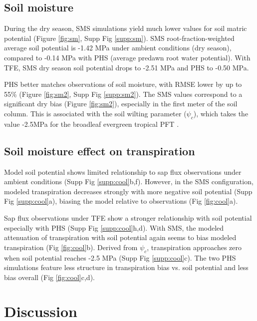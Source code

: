 \documentclass[draft,linenumbers]{agujournal}
\begin{document}
\subsection{Soil moisture}
    During the dry season, SMS simulations yield much lower values for soil matric potential (Figure \ref{fig:sm}, Supp Fig \ref{supp:sm}). 
    SMS root-fraction-weighted average soil potential is -1.42 MPa under ambient conditions (dry season), compared to -0.14 MPa with PHS (average predawn root water potential).
    With TFE, SMS dry season soil potential drops to -2.51 MPa and PHS to -0.50 MPa.

    PHS better matches observations of soil moisture, with RMSE lower by up to 55\% (Figure \ref{fig:sm2}, Supp Fig \ref{supp:sm2}).
    The SMS values correspond to a significant dry bias (Figure \ref{fig:sm2}), especially in the first meter of the soil column.
    This is associated with the soil wilting parameter ($\psi_c$), which takes the value -2.5MPa for the broadleaf evergreen tropical PFT \citep{oleson2013}.
 
\subsection{Soil moisture effect on transpiration}    
    Model soil potential shows limited relationship to sap flux observations under ambient conditions (Supp Fig \ref{supp:cool}b,f).
    However, in the SMS configuration, modeled transpiration decreases strongly with more negative soil potential (Supp Fig \ref{supp:cool}a),
    biasing the model relative to observations (Fig \ref{fig:cool}a).
    
    Sap flux observations under TFE show a stronger relationship with soil potential especially with PHS (Supp Fig \ref{supp:cool}h,d).
    With SMS, the modeled attenuation of transpiration with soil potential again seems to bias modeled transpiration (Fig \ref{fig:cool}b).
    Derived from $\psi_c$, transpiration approaches zero when soil potential reaches -2.5 MPa (Supp Fig \ref{supp:cool}c).
    The two PHS simulations feature less structure in transpiration bias vs. soil potential and less bias overall (Fig \ref{fig:cool}c,d).
    
\section{Discussion}
\end{document}
